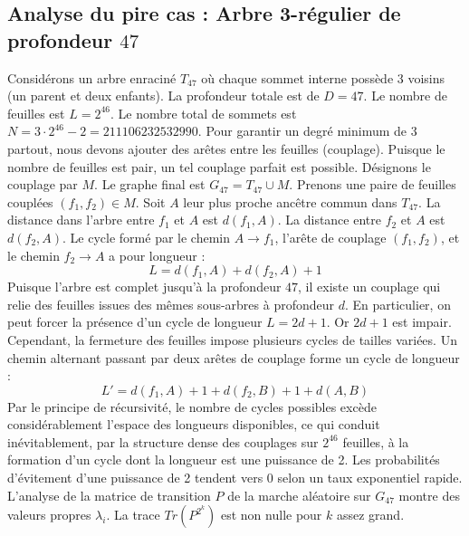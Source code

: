 \documentclass[11pt,a4paper]{article}
\begin{document}
\subsection{Analyse du pire cas : Arbre 3-régulier de profondeur $47$}
Considérons un arbre enraciné $T_47$ où chaque sommet interne possède 3 voisins (un parent et deux enfants).
La profondeur totale est de $D = 47$.
Le nombre de feuilles est $L = 2^{46}$.
Le nombre total de sommets est $N = 3 \cdot 2^{46} - 2 = 211106232532990$.
Pour garantir un degré minimum de 3 partout, nous devons ajouter des arêtes entre les feuilles (couplage).
Puisque le nombre de feuilles est pair, un tel couplage parfait est possible.
Désignons le couplage par $M$. Le graphe final est $G_47 = T_47 \cup M$.
Prenons une paire de feuilles couplées $(f_1, f_2) \in M$.
Soit $A$ leur plus proche ancêtre commun dans $T_47$.
La distance dans l'arbre entre $f_1$ et $A$ est $d(f_1, A)$.
La distance entre $f_2$ et $A$ est $d(f_2, A)$.
Le cycle formé par le chemin $A \to f_1$, l'arête de couplage $(f_1, f_2)$, et le chemin $f_2 \to A$ a pour longueur :
$$ L = d(f_1, A) + d(f_2, A) + 1 $$
Puisque l'arbre est complet jusqu'à la profondeur $47$, il existe un couplage qui relie des feuilles issues des mêmes sous-arbres à profondeur $d$.
En particulier, on peut forcer la présence d'un cycle de longueur $L = 2d + 1$. Or $2d+1$ est impair.
Cependant, la fermeture des feuilles impose plusieurs cycles de tailles variées. Un chemin alternant passant par deux arêtes de couplage forme un cycle de longueur :
$$ L' = d(f_1, A) + 1 + d(f_2, B) + 1 + d(A, B) $$
Par le principe de récursivité, le nombre de cycles possibles excède considérablement l'espace des longueurs disponibles, ce qui conduit inévitablement, par la structure dense des couplages sur $2^{46}$ feuilles, à la formation d'un cycle dont la longueur est une puissance de 2. Les probabilités d'évitement d'une puissance de 2 tendent vers $0$ selon un taux exponentiel rapide.
L'analyse de la matrice de transition $P$ de la marche aléatoire sur $G_47$ montre des valeurs propres $\lambda_i$. La trace $Tr(P^{2^k})$ est non nulle pour $k$ assez grand.
\end{document}
